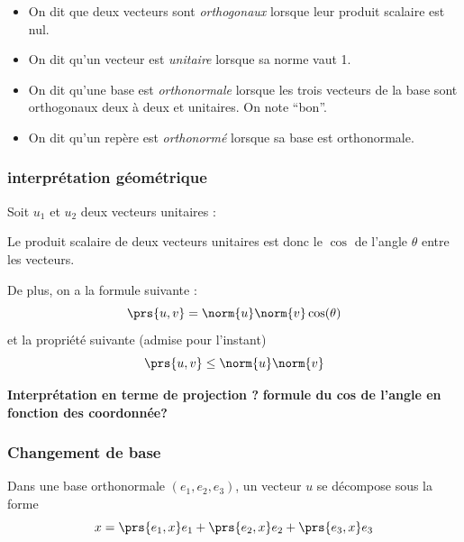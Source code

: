 \begin{definition}
	\begin{itemize}
		\item On dit que deux vecteurs sont \emph{orthogonaux} lorsque leur produit scalaire est nul.
		\item On dit qu'un vecteur est \emph{unitaire} lorsque sa norme vaut 1.
		\item On dit qu'une base est \emph{orthonormale} lorsque les trois vecteurs de la base sont orthogonaux deux à deux et unitaires. On note ``bon''.
		\item On dit qu'un repère est \emph{orthonormé} lorsque sa base est orthonormale.
	\end{itemize}
\end{definition}

\subsubsection{interprétation géométrique}

Soit $u_1$ et $u_2$ deux vecteurs unitaires :
\begin{center}
\end{center}
Le produit scalaire de deux vecteurs unitaires est donc le $\cos$ de l'angle $\theta$ entre les vecteurs.

De plus, on a la formule suivante : 
\[
	\prs{u,v} = \norm{u}\norm{v} \cos(\theta)
\]
et la propriété suivante (admise pour l'instant) 
\[
	\prs{u,v} \leq \norm{u}\norm{v}
\]

{\bf Interprétation en terme de projection ?}
{\bf formule du cos de l'angle en fonction des coordonnée?}

\subsubsection{Changement de base}

\begin{proposition}
	Dans une base orthonormale $(e_1,e_2,e_3)$, un vecteur $u$ se décompose sous la forme\[
		x = \prs{e_1,x} e_1 + \prs{e_2,x} e_2 + \prs{e_3,x} e_3
	\]
\end{proposition}

